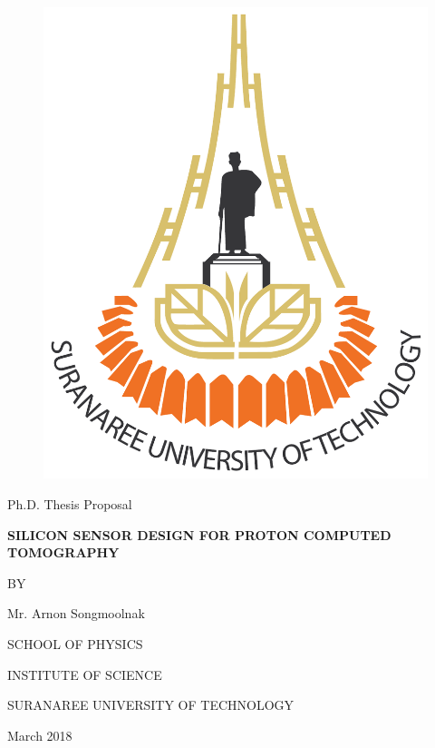 \documentclass[12pt,a4paper]{article}
\begin{document}
\begin{figure}[t]
\vskip -1cm
\begin{center}
\includegraphics[width=3.5CM]{figure/SUT_Logo}
\end{center}
\label{fig:Logo}
\end{figure}
\begin{center}
\Large{Ph.D. Thesis Proposal}
\end{center}
\vspace{-0.1cm}
\begin{center}
{\textbf{\MakeUppercase{Silicon Sensor Design for Proton Computed Tomography}}}\\
\vspace{-0.1cm}
\LARGE{\textbf{\setmainfont{THSarabun.ttf}{การออกแบบเซนเซอร์ชนิดซิลิกอนสำหรับการสร้างภาพส่วนตัดด้วยอนุภาคโปรตอนโดยอาศัยคอมพิวเตอร์}}}
\end{center}
\vspace{0.5cm}
\begin{center}
BY
\end{center}
\begin{center}
\Large{Mr. Arnon Songmoolnak}
\end{center}
\vspace{0.5cm}
\begin{center}
SCHOOL OF PHYSICS
\end{center}
\begin{center}
INSTITUTE OF SCIENCE
\end{center}
\begin{center}
SURANAREE UNIVERSITY OF TECHNOLOGY
\end{center}
\begin{center}
March 2018
\end{center}
\end{document}
